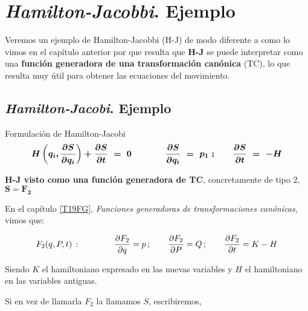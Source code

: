 \chapter{\emph{Hamilton-Jacobbi}. Ejemplo}


\vspace{10mm}
\begin{adjustwidth}{50pt}{50pt}
\begin{ejemplo}
Veremos un ejemplo de Hamilton-Jacobbi (H-J) de modo diferente a como lo vimos en el capítulo anterior por que resulta que \textbf{H-J} se puede interpretar como una \textbf{función generadora de una transformación canónica} (TC), lo que resulta muy útil para obtener las ecuaciones del movimiento.

\end{ejemplo}
\end{adjustwidth}
\vspace{5mm}

\section{\emph{Hamilton-Jacobi}. Ejemplo}

\begin{myblock}{Formulación de Hamilton-Jacobi}
\begin{equation}
\label{T27FHJ}
\boldsymbol{
H\left( q_i, \pdv{S}{q_i} \right) + \pdv{S}{t} \ = \ 0 \qquad \qquad \pdv{S}{q_i}\ = \ p_1\ ;\qquad \pdv{S}{t} \ = \ - H
}	
\end{equation}	
\end{myblock}

\textbf{H-J visto como una función generadora de TC}, concretamente de tipo 2, $\boldsymbol {S=F_2}$

En el capítulo \ref{T19FG}, \emph{Funciones generadoras de transformaciones canónicas}, vimos que:

$$F_2(q,P,t)\, : \qquad \qquad \displaystyle \pdv{F_2}{q}=p\, ; \qquad \pdv{F_2}{P}=Q\, ; \qquad \pdv{F_2}{t}=K-H$$

Siendo $K$ el hamiltoniano expresado en las nuevas variables y $H$ el hamiltoniano en las variables antiguas.

Si en vez de llamarla $F_2$ la llamamos $S$, escribiremos,

